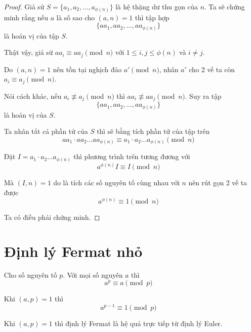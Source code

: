 \begin{proof}
    Giả sử $S = \{a_1, a_2, \ldots, a_{\phi(n)}\}$ là hệ thặng dư thu gọn của $n$. Ta sẽ chứng minh rằng nếu $a$ là số sao cho $(a, n)=1$ thì tập hợp
    $$\{a a_1, a a_2, \ldots, a a_{\phi(n)}\}$$ là hoán vị của tập $S$.

    Thật vậy, giả sử $a a_i \equiv a a_j \pmod n$ với $1 \leq i, j \leq \phi(n)$ và $i \neq j$.

    Do $(a, n) = 1$ nên tồn tại nghịch đảo $a' \pmod n$, nhân $a'$ cho 2 vế ta còn $a_i \equiv a_j \pmod n$.

    Nói cách khác, nếu $a_i \not\equiv a_j \pmod n$ thì $a a_i \not\equiv a a_j \pmod n$. Suy ra tập
    $$\{a a_1, a a_2, \ldots, a a_{\phi(n)}\}$$ là hoán vị của $S$.

    Ta nhân tất cả phần tử của $S$ thì sẽ bằng tích phần tử của tập trên
    $$a a_1 \cdot a a_2 \ldots a a_{\phi(n)} \equiv a_1 \cdot a_2 \ldots a_{\phi(n)} \pmod n$$

    Đặt $I = a_1 \cdot a_2 \ldots a_{\phi(n)}$ thì phương trình trên tương đương với 
    $$a^{\phi(n)} I \equiv I \pmod n$$
    
    Mà $(I, n) = 1$ do là tích các số nguyên tố cùng nhau với $n$ nên rút gọn 2 vế ta được
    $$a^{\phi(n)} \equiv 1 \pmod n$$

    Ta có điều phải chứng minh.
\end{proof}

\section{Định lý Fermat nhỏ}

    \begin{theorem}    
    Cho số nguyên tố $p$. Với mọi số nguyên $a$ thì $$a^p \equiv a \pmod p$$

    Khi $(a, p) = 1$ thì \[a^{p-1} \equiv 1 \pmod p\]
    \end{theorem}

\begin{remark}
    Khi $(a, p) = 1$ thì định lý Fermat là hệ quả trực tiếp từ định lý Euler.
\end{remark}